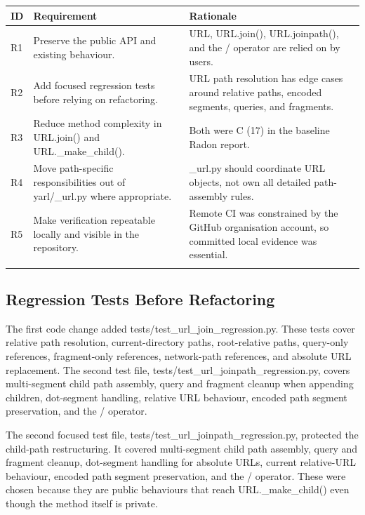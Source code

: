 \documentclass[11pt,a4paper]{article}
\begin{document}
\begin{longtable}{p{} p{} p{}}
\toprule
ID & Requirement & Rationale \\
\midrule
R1 & Preserve the public API and existing behaviour. & URL, URL.join(), URL.joinpath(), and the / operator are relied on by users. \\
\addlinespace
R2 & Add focused regression tests before relying on refactoring. & URL path resolution has edge cases around relative paths, encoded segments, queries, and fragments. \\
\addlinespace
R3 & Reduce method complexity in URL.join() and URL.\_make\_child(). & Both were C (17) in the baseline Radon report. \\
\addlinespace
R4 & Move path-specific responsibilities out of yarl/\_url.py where appropriate. & \_url.py should coordinate URL objects, not own all detailed path-assembly rules. \\
\addlinespace
R5 & Make verification repeatable locally and visible in the repository. & Remote CI was constrained by the GitHub organisation account, so committed local evidence was essential. \\
\addlinespace
\bottomrule
\end{longtable}


\subsection*{Regression Tests Before Refactoring}


The first code change added tests/test\_url\_join\_regression.py. These tests cover relative path resolution, current-directory paths, root-relative paths, query-only references, fragment-only references, network-path references, and absolute URL replacement. The second test file, tests/test\_url\_joinpath\_regression.py, covers multi-segment child path assembly, query and fragment cleanup when appending children, dot-segment handling, relative URL behaviour, encoded path segment preservation, and the / operator.


The second focused test file, tests/test\_url\_joinpath\_regression.py, protected the child-path restructuring. It covered multi-segment child path assembly, query and fragment cleanup, dot-segment handling for absolute URLs, current relative-URL behaviour, encoded path segment preservation, and the / operator. These were chosen because they are public behaviours that reach URL.\_make\_child() even though the method itself is private.
\end{document}
